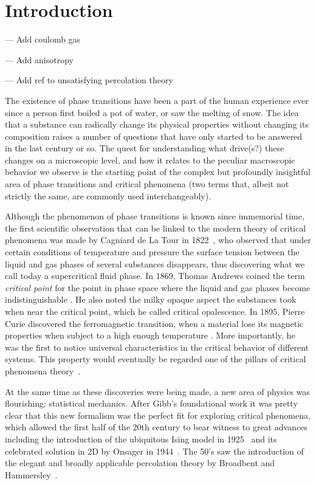 \chapter{Introduction}
\label{ch:intr}


--- Add coulomb gas~\cite{Minnhagen1987}

--- Add anisotropy

--- Add ref to unsatisfying percolation theory

The existence of phase transitions have been a part of the human experience ever
since a person first boiled a pot of water, or saw the melting of snow. The
idea that a substance can radically change its physical properties without
changing its composition raises a number of questions that have only started to
be answered in the last century or so. The quest for understanding what
drive(s?) these changes on a microscopic level, and how it relates to the
peculiar macroscopic behavior we observe is the starting point of the complex
but profoundly insightful area of phase transitions and critical phenomena (two
terms that, albeit not strictly the same, are commonly used interchangeably).

Although the phenomenon of phase transitions is known since immemorial time,
the first scientific observation that can be linked to the modern theory of
critical phenomena was made by Cagniard de La Tour in 1822~\cite{delaTour1822},
who observed that under certain conditions of temperature and pressure the
surface tension between the liquid and gas phases of several substances
disappears, thus discovering what we call today a supercritical fluid phase. In
1869, Thomas Andrews coined the term \textit{critical point} for the point in
phase space where the liquid and gas phases become indistinguishable
\cite{Andrews1869}. He also noted the milky opaque aspect the substances took
when near the critical point, which he called critical opalescence.
In 1895, Pierre Curie discovered the ferromagnetic transition, when a material
lose its magnetic properties when subject to a high enough temperature
\cite{Curie1895}. More importantly, he was the first to notice universal
characteristics in the critical behavior of different systems. This property
would eventually be regarded one of the pillars of critical phenomena
theory~\cite{Stanley1999}.

At the same time as these discoveries were being made, a new area of physics
was flourishing: statistical mechanics. After Gibb's foundational work
\cite{Gibbs1906} it was pretty clear that this new formalism was the perfect
fit for exploring critical phenomena, which allowed the first half of the 20th
century to bear witness to great advances including the introduction of the
ubiquitous Ising model in 1925~\cite{Ising1925} and its celebrated solution in
2D by Onsager in 1944~\cite{Onsager1944}. The 50's saw the introduction of the
elegant and broadly applicable percolation theory by Broadbent and
Hammersley~\cite{Broadbent1957}.

